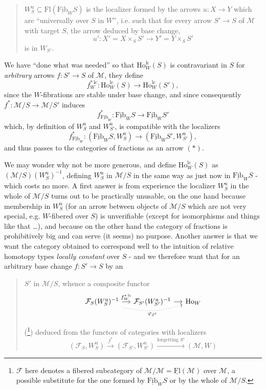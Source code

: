 \documentclass[11pt]{article}
\newcommand{\printedpage}[1]{\marginpar{\footnotesize p.~#1}}
\newcommand{\msp}[1]{\marginpar{\footnotesize [#1]}}
\newcommand{\cM}{\mathcal{M}}
\newcommand{\cF}{\mathcal{F}}
\newcommand{\Ho}{\mathrm{Ho}}
\newcommand{\Fl}{\mathrm{Fl}}
\newcommand{\Fib}{\underline{\mathrm{Fib}}}
\newcommand{\Wu}{W^{\mathrm{u}}}
\newcommand{\lc}{\mathrm{lc}}
\begin{document}
\begin{quote}
$\Wu_S \subseteq \Fl(\Fib_W S)$ is the localizer formed by the arrows $u : X \longrightarrow Y$ which are ``universally over $S$ in $W$'', i.e. such that for every arrow $S' \longrightarrow S$ of $\cM$ with target $S$, the arrow deduced by base change,
\[
u' : X' = X \times_S S' \longrightarrow Y' = Y \times_S S'
\]
is in $W_{S'}$.
\end{quote}

We have ``done what was needed'' so that $\Ho^{\lc}_W(S)$ is contravariant in $S$ for \textit{arbitrary} arrows $f : S' \longrightarrow S$ of $\cM$, they define
\[
f^{*\,\lc}_W : \Ho^{\lc}_W(S) \longrightarrow \Ho^{\lc}_W(S'), \tag*{$(**)$}
\]
\msp{page 211}
since the $W$-fibrations are stable under base change, and since consequently $f^* : \cM/S \longrightarrow \cM/S'$ induces
\[
f^*_{\Fib_W} : \Fib_W S \longrightarrow \Fib_W S'
\]
which, by definition of $\Wu_S$ and $\Wu_{S'}$, is compatible with the localizers
\[
f^*_{\Fib_W} : (\Fib_W S, \Wu_S) \longrightarrow (\Fib_W S', \Wu_{S'}),
\]
and thus passes to the categories of fractions as an arrow $(*)$.

We may wonder why not be more generous, and define $\Ho^{\lc}_W(S)$ as $(\cM/S)(\Wu_S)^{-1}$, defining $\Wu_S$ in $\cM/S$ in the same way as just now in $\Fib_W S$ - which costs no more. A first answer is from experience the localizer $\Wu_S$ in the whole of $\cM/S$ turns out to be practically unusable, on the one hand because membership in $\Wu_S$ (for an arrow between objects of $\cM/S$ which are not very special, e.g. $W$-fibered over $S$) is unverifiable (except for isomorphisms and things like that \dots), and because on the other hand the category of fractions is prohibitively
\printedpage{137}
\msp{page 212}
big and can serve (it seems) no purpose. Another answer is that we want the category obtained to correspond well to the intuition of relative homotopy types \textit{locally constant} over $S$ - and we therefore want that for an arbitrary base change $f : S' \longrightarrow S$ by an

\begin{quote}
$S'$ in $\cM/S$, whence a composite functor
\[
\begin{tikzcd}[column sep=small]
\cF_S(\Wu_S)^{-1} \arrow[r, "f^{*\,\lc}_W"] \arrow[rr, dotted, bend right=15, "\varphi_{S'}"'] & \cF_{S'}(\Wu_{S'})^{-1} \arrow[r] & \Ho_W
\end{tikzcd}
\]

(\footnote[121]{$\cF$ here denotes a fibered subcategory of $\cM/\cM = \underline{\Fl}(\cM)$ over $\cM$, a possible substitute for the one formed by $\Fib_W S$ or by the whole of $\cM/S$.}) deduced from the functors of categories with localizers
\[
(\cF_S, \Wu_S) \xrightarrow{f^*} (\cF_{S'}, \Wu_{S'}) \xrightarrow{\text{forgetting } S'} (\cM, W)
\]
\end{quote}
\end{document}
